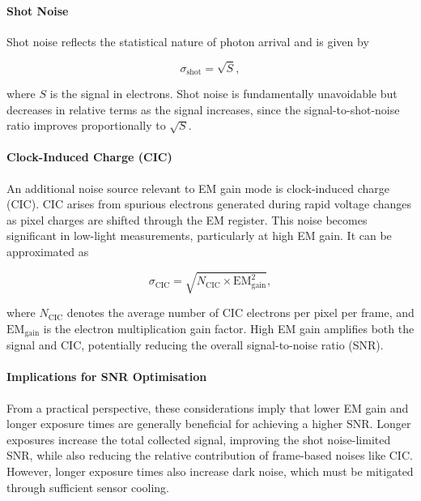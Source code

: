\documentclass[
	parskip=half,
	a4paper,
]{scrarticle}
\begin{document}
\paragraph{Shot Noise}

Shot noise reflects the statistical nature of photon arrival and is given by

\begin{equation}
    \sigma_{\text{shot}} = \sqrt{S},
\end{equation}

where $S$ is the signal in electrons. Shot noise is fundamentally unavoidable but decreases in relative terms as the signal increases, since the signal-to-shot-noise ratio improves proportionally to $\sqrt{S}$.

\paragraph{Clock-Induced Charge (CIC)}

An additional noise source relevant to EM gain mode is clock-induced charge (CIC). CIC arises from spurious electrons generated during rapid voltage changes as pixel charges are shifted through the EM register. This noise becomes significant in low-light measurements, particularly at high EM gain. It can be approximated as

\begin{equation}
    \sigma_{\text{CIC}} = \sqrt{N_{\text{CIC}} \times \text{EM}_{\text{gain}}^2},
\end{equation}

where $N_{\text{CIC}}$ denotes the average number of CIC electrons per pixel per frame, and $\text{EM}_{\text{gain}}$ is the electron multiplication gain factor. High EM gain amplifies both the signal and CIC, potentially reducing the overall signal-to-noise ratio (SNR).

\paragraph{Implications for SNR Optimisation}

From a practical perspective, these considerations imply that lower EM gain and longer exposure times are generally beneficial for achieving a higher SNR. Longer exposures increase the total collected signal, improving the shot noise-limited SNR, while also reducing the relative contribution of frame-based noises like CIC. However, longer exposure times also increase dark noise, which must be mitigated through sufficient sensor cooling.
\end{document}
